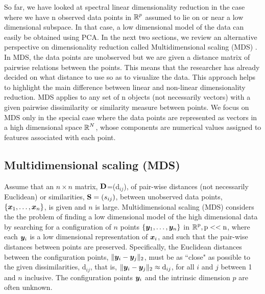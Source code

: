 So far, we have looked at spectral linear dimensionality reduction in the case where we have n observed data points in $\operatorname{\mathbb{R}}^{p}$ assumed to lie on or near a low dimensional subspace. In that case, a low dimensional model of the data can easily be obtained using PCA. In the next two sections, we review an alternative perspective on dimensionality reduction called Multidimensional scaling (MDS) 
\cite{CoxT2000, MardiaK.V1979Ma}. In MDS, the data points are unobserved but we are given a distance matrix of pairwise relations between the points.
This means that the researcher has already decided on what distance to use so as
to visualize the data. This approach helps to highlight the main difference between linear and non-linear dimensionality reduction. MDS applies to any set of n objects (not necessarily vectors) with a given pairwise dissimilarity
or similarity measure between points. We focus on MDS only in the special case where the data points are represented as vectors in a high dimensional space $\operatorname{\mathbb{R}}^{N}$, whose components are numerical values assigned to features associated with each point.


%



\subsection{Multidimensional scaling (MDS)}
Assume that an $n\times n$ matrix, $\textbf{D}$=(d$_{ij}$), of pair-wise distances
(not necessarily Euclidean) or similarities, $\textbf{S} = (s_{ij})$, between unobserved  data points, $\{\boldsymbol{x}_{1}, \ldots, \boldsymbol{x}_{n} \}$, is given and $n$ is large.
Multidimensional scaling (MDS) \cite{CoxT2000, MardiaK.V1979Ma} considers the the problem of finding a low dimensional model of the high dimensional data by searching for a configuration of $n$ points $\{\boldsymbol{y}_{1}, \ldots, \boldsymbol{y}_{n} \}$ in $\operatorname{\mathbb{R}}^{\text{p}}, \text{p} << \text{n}$, where each $\boldsymbol{y}_{i}$ is a low dimensional representation of $\boldsymbol{x}_{i}$, and such that the pair-wise distances between points are preserved. Specifically, the Euclidean distances between the configuration points, $\lVert\boldsymbol{y}_{i} - \boldsymbol{y}_{j}\rVert_{2}$, must be as ``close" as possible to  the given dissimilarities, d$_{ij}$, that is, $\lVert\boldsymbol{y}_{i} - \boldsymbol{y}_{j}\rVert_{2} \approx \text{d}_{ij}$, for all $i$ and $j$ between 1 and $n$ inclusive. The configuration points $\boldsymbol{y}_{i}$ and the intrinsic dimension $p$ are often unknown.\\

